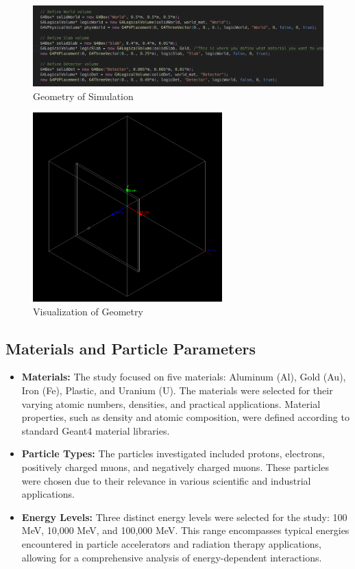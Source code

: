 \documentclass{article}
\begin{document}
\begin{figure}[H]
\centering
\includegraphics[width=1\textwidth]{Screenshot from 2024-07-31 20-31-58.png}
\caption{Geometry of Simulation}
\end{figure}

\begin{figure}[H]
\centering
\includegraphics[width=0.65\textwidth]{Screenshot from 2024-07-31 20-26-55.png}
\caption{Visualization of Geometry}
\end{figure}

\subsection{Materials and Particle Parameters}

\begin{itemize}
    \item \textbf{Materials:} The study focused on five materials: Aluminum (Al), Gold (Au), Iron (Fe), Plastic, and Uranium (U). The materials were selected for their varying atomic numbers, densities, and practical applications. Material properties, such as density and atomic composition, were defined according to standard Geant4 material libraries.

    \item \textbf{Particle Types:} The particles investigated included protons, electrons, positively charged muons, and negatively charged muons. These particles were chosen due to their relevance in various scientific and industrial applications.

    \item \textbf{Energy Levels:} Three distinct energy levels were selected for the study: 100 MeV, 10,000 MeV, and 100,000 MeV. This range encompasses typical energies encountered in particle accelerators and radiation therapy applications, allowing for a comprehensive analysis of energy-dependent interactions.
\end{itemize}
\end{document}
